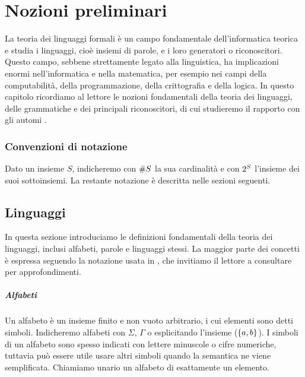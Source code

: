 \chapter{Nozioni preliminari}
La teoria dei linguaggi formali è un campo fondamentale dell'informatica teorica e studia i linguaggi, cioè insiemi di parole, e i loro generatori o riconoscitori. Questo campo, sebbene strettamente legato alla linguistica, ha implicazioni enormi nell'informatica e nella matematica, per esempio nei campi della computabilità, della programmazione, della crittografia e della logica. In questo capitolo ricordiamo al lettore le nozioni fondamentali della teoria dei linguaggi, delle grammatiche e dei principali riconoscitori, di cui studieremo il rapporto con gli automi .


\subsection*{Convenzioni di notazione}
Dato un insieme $S$, indicheremo con $\# S$ la sua cardinalità e con $2^{S}$ l'insieme dei suoi sottoinsiemi.
La restante notazione è descritta nelle sezioni seguenti.


\section{Linguaggi}
In questa sezione introduciamo le definizioni fondamentali della teoria dei linguaggi, inclusi alfabeti, parole e linguaggi stessi. La maggior parte dei concetti è espressa seguendo la notazione usata in \cite{Hopcroft:79:introLFA}, che invitiamo il lettore a consultare per approfondimenti.

\paragraph{Alfabeti} Un alfabeto è un insieme finito e non vuoto arbitrario, i cui elementi sono detti simboli. Indicheremo alfabeti con $\Sigma$, $\Gamma$ o esplicitando l'insieme ($\left\{ a,b \right\}$). I simboli di un alfabeto sono spesso indicati con lettere minuscole o cifre numeriche, tuttavia può essere utile usare altri simboli quando la semantica ne viene semplificata. Chiamiamo unario un alfabeto di esattamente un elemento.

